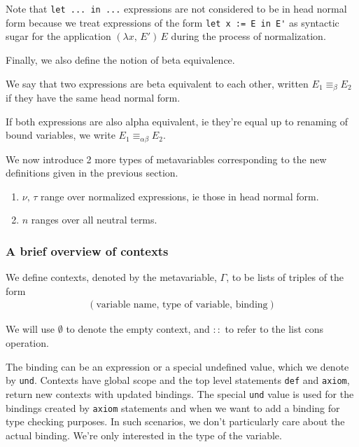 \documentclass{article}
\begin{document}
Note that \verb|let ... in ...| expressions are not considered to be in head normal form
because we treat expressions of the form \verb|let x := E in E'| as syntactic
sugar for the application $(\lambda x, \, E') \, E$ during the process of
normalization.

Finally, we also define the notion of beta equivalence. 

\begin{definition} 
We say that two expressions are beta equivalent to each other, written
$E_1 \equiv_\beta E_2$ if they have the same head normal form.

If both expressions are also alpha equivalent, ie
they're equal up to renaming of bound variables, we write
$E_1 \equiv_{\alpha \beta} E_2$.
\end{definition}

We now introduce 2 more types of metavariables corresponding to the new definitions
given in the previous section. 

\begin{enumerate}
\item $\nu, \, \tau$ range over normalized expressions, ie those in head normal
form.
\item $n$ ranges over all neutral terms.
\end{enumerate}

\subsubsection{A brief overview of contexts}
We define contexts, denoted by the metavariable, $\Gamma$, to be lists of
triples of the form
\begin{align*}
  (\text{variable name}, \, \text{type of variable}, \, \text{binding})
\end{align*}

We will use $\emptyset$ to denote the empty context, and $::$ to refer to the
list cons operation.

The binding can be an expression or a special undefined value, which we denote by
\verb|und|.
Contexts have global scope and the top level statements \verb|def|
and \verb|axiom|, return new contexts with updated bindings.
The special \verb|und| value is used for the bindings created by \verb|axiom|
statements and when we want to add a binding for type checking purposes.
In such scenarios, we don't particularly care about the actual binding. We're
only interested in the type of the variable. 
\end{document}

